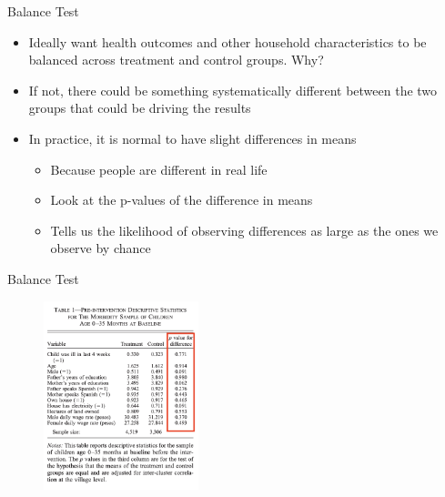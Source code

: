 \documentclass[11pt,notes=hide,aspectratio=169,mathserif]{beamer}
\begin{document}
\begin{frame}{Balance Test}
\begin{itemize}
\item Ideally want health outcomes and other household characteristics to be balanced across treatment and control groups. Why?
\pause \item If not, there could be something systematically different between the two groups that could be driving the results 
\pause \item In practice, it is normal to have slight differences in means 
\begin{itemize}
    \pause \item Because people are different in real life 
    \pause \item Look at the p-values of the difference in means 
    \pause \item Tells us the likelihood of observing differences as large as the ones we observe by chance 
\end{itemize}
\end{itemize}
\end{frame}

\begin{frame}{Balance Test}
\begin{figure}
\centering
\includegraphics[width=0.4\textwidth]{inputs/table1.png}
\end{figure}
\end{frame}
\end{document}
